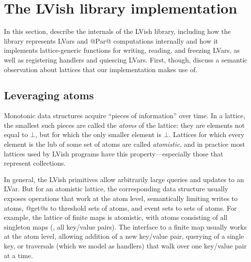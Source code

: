 \section{The LVish library implementation}\label{s:lvish-internals}


In this section,  describe the internals of the LVish library,
including how the library represents LVars and @Par@ computations
internally and how it implements lattice-generic functions for
writing, reading, and freezing LVars, as well as registering handlers
and quiescing LVars.  First, though,  discuss a semantic
observation about lattices that our implementation makes use of.

\subsection{Leveraging atoms}\label{subsection:lvish-leveraging-atoms}

Monotonic data structures acquire ``pieces of information'' over time.
In a lattice, the smallest such pieces are called the \emph{atoms} of
the lattice: they are elements not equal to $\bot$, but for which the
only smaller element is $\bot$.  Lattices for which every element is
the lub of some set of atoms are called \emph{atomistic}, and in
practice most lattices used by LVish programs
have this property---especially those that represent
collections.

In general, the LVish primitives allow arbitrarily large queries and
updates to an LVar.  But for an atomistic lattice, the corresponding
data structure usually exposes operations that work at the atom level,
semantically limiting writes to atoms, @get@s to threshold sets of
atoms, and event sets to sets of atoms.  For example, the lattice of
finite maps is atomistic, with atoms consisting of all singleton maps
(\ie, all key/value pairs).  The interface to a finite map usually
works at the atom level, allowing addition of a new key/value pair,
querying of a single key, or traversals (which we model as handlers)
that walk over one key/value pair at a time.

